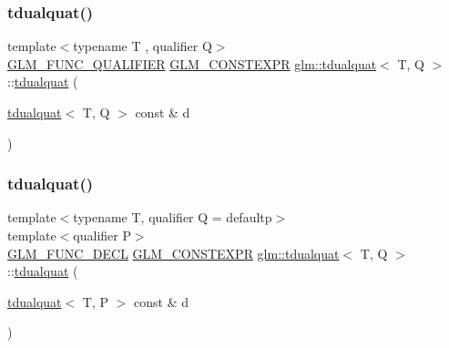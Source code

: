 \subsubsection{\texorpdfstring{tdualquat()}{tdualquat()}\hspace{0.1cm}{\footnotesize\ttfamily [2/11]}}
{\footnotesize\ttfamily template$<$typename T , qualifier Q$>$ \\
\hyperlink{setup_8hpp_a33fdea6f91c5f834105f7415e2a64407}{G\+L\+M\+\_\+\+F\+U\+N\+C\+\_\+\+Q\+U\+A\+L\+I\+F\+I\+ER} \hyperlink{setup_8hpp_a08b807947b47031d3a511f03f89645ad}{G\+L\+M\+\_\+\+C\+O\+N\+S\+T\+E\+X\+PR} \hyperlink{structglm_1_1tdualquat}{glm\+::tdualquat}$<$ T, Q $>$\+::\hyperlink{structglm_1_1tdualquat}{tdualquat} (\begin{DoxyParamCaption}\item[{\hyperlink{structglm_1_1tdualquat}{tdualquat}$<$ T, Q $>$ const \&}]{d }\end{DoxyParamCaption})}

\mbox{\label{structglm_1_1tdualquat_a23b9100d907a648204929a4c3392a56a}} 
\subsubsection{\texorpdfstring{tdualquat()}{tdualquat()}\hspace{0.1cm}{\footnotesize\ttfamily [3/11]}}
{\footnotesize\ttfamily template$<$typename T, qualifier Q = defaultp$>$ \\
template$<$qualifier P$>$ \\
\hyperlink{setup_8hpp_ab2d052de21a70539923e9bcbf6e83a51}{G\+L\+M\+\_\+\+F\+U\+N\+C\+\_\+\+D\+E\+CL} \hyperlink{setup_8hpp_a08b807947b47031d3a511f03f89645ad}{G\+L\+M\+\_\+\+C\+O\+N\+S\+T\+E\+X\+PR} \hyperlink{structglm_1_1tdualquat}{glm\+::tdualquat}$<$ T, Q $>$\+::\hyperlink{structglm_1_1tdualquat}{tdualquat} (\begin{DoxyParamCaption}\item[{\hyperlink{structglm_1_1tdualquat}{tdualquat}$<$ T, P $>$ const \&}]{d }\end{DoxyParamCaption})}

\mbox{\label{structglm_1_1tdualquat_aca6bbe930bd0b26c217b535fe06df688}} 
